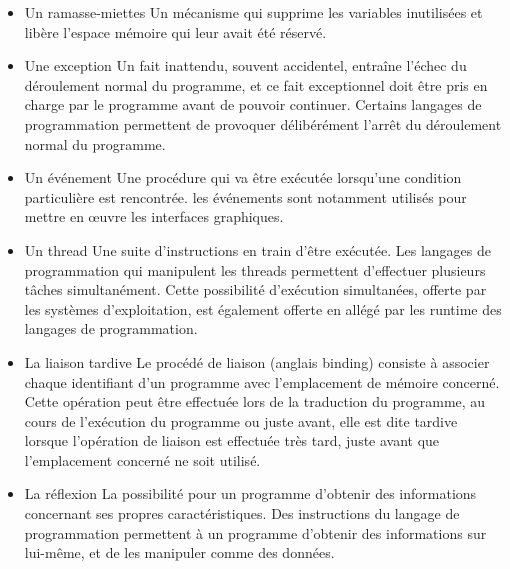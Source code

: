 \documentclass[a4paper,12pt]{article}
\begin{document}
\begin{itemize}[label=\textbullet]

\setlength{\itemindent}{-1.5em}

\item Un ramasse-miettes
\newline Un mécanisme qui supprime les variables inutilisées et libère l'espace mémoire qui leur avait été réservé\cite{chris}.

\item Une exception
\newline Un fait inattendu, souvent accidentel, entraîne l'échec du déroulement normal du programme, et ce fait exceptionnel doit être pris en charge par le programme avant de pouvoir continuer. Certains langages de programmation permettent de provoquer délibérément l'arrêt du déroulement normal du programme\cite{friesen}.

\item Un événement
\newline Une procédure qui va être exécutée lorsqu'une condition particulière est rencontrée. les événements sont notamment utilisés pour mettre en œuvre les interfaces graphiques\cite{harold}.

\item Un thread
\newline Une suite d'instructions en train d'être exécutée. Les langages de programmation qui manipulent les threads permettent d'effectuer plusieurs tâches simultanément. Cette possibilité d'exécution simultanées, offerte par les systèmes d'exploitation, est également offerte en allégé par les runtime des langages de programmation\cite{brent}.

\item La liaison tardive
\newline Le procédé de liaison (anglais binding) consiste à associer chaque identifiant d'un programme avec l'emplacement de mémoire concerné. Cette opération peut être effectuée lors de la traduction du programme, au cours de l'exécution du programme ou juste avant\cite{sibsankar}, elle est dite tardive lorsque l'opération de liaison est effectuée très tard, juste avant que l'emplacement concerné ne soit utilisé\cite{amit}.

\item La réflexion
\newline La possibilité pour un programme d'obtenir des informations concernant ses propres caractéristiques. Des instructions du langage de programmation permettent à un programme d'obtenir des informations sur lui-même, et de les manipuler comme des données\cite{kishori}.

\end{itemize}
\end{document}
